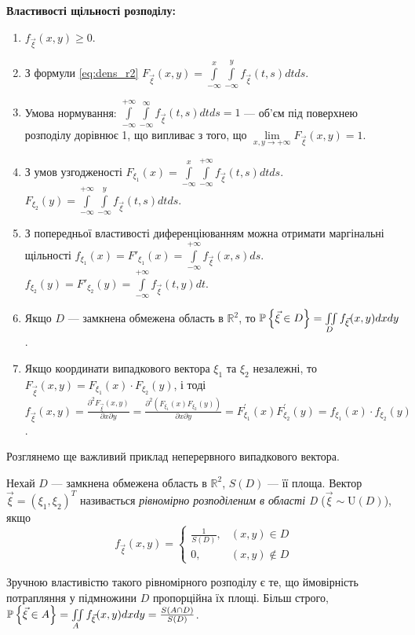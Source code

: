 \noindent\textbf{Властивості щільності розподілу:}
\begin{enumerate}
    \item $f_{\vec{\xi}}(x, y) \geq 0$.
    \item З формули \eqref{eq:dens_r2} $F_{\vec{\xi}}(x, y) 
    = \int\limits_{-\infty}^x \int\limits_{-\infty}^y f_{\vec{\xi}}(t, s) 
    dt ds $.
    \item Умова нормування: 
    $\int\limits_{-\infty}^{+\infty} \int\limits_{-\infty}^{\infty} f_{\vec{\xi}}(t, s) 
    dt ds = 1$ --- об'єм під поверхнею розподілу 
    дорівнює 1, що випливає з того, що $\lim\limits_{x,y \to +\infty} F_{\vec{\xi}}(x, y) = 1$.
    \item З умов узгодженості $F_{\xi_1}(x) = \int\limits_{-\infty}^{x} \int\limits_{-\infty}^{+\infty} 
    f_{\vec{\xi}}(t, s) dt ds$.
    $F_{\xi_2}(y) = \int\limits_{-\infty}^{+\infty} \int\limits_{-\infty}^{y} 
    f_{\vec{\xi}}(t, s) dt ds$.
    \item З попередньої властивості диференціюванням можна отримати маргінальні щільності $f_{\xi_1}(x) = F'_{\xi_1}(x) 
    = \int\limits_{-\infty}^{+\infty} f_{\vec{\xi}}(x, s) ds $.
    $f_{\xi_2}(y) = F'_{\xi_2}(y) 
    = \int\limits_{-\infty}^{+\infty} f_{\vec{\xi}}(t, y) dt $.
    
    \item Якщо $D$ --- замкнена обмежена область в $\mathbb{R}^2$, то 
    $\P\left\{ \vec{\xi} \in D \right\} = \iint\limits_D f_{\vec{\xi}}(x, y) 
    dx dy$.
    \item Якщо координати випадкового вектора $\xi_1$ та $\xi_2$ незалежні, то
    $F_{\vec{\xi}}(x, y) = 
    F_{\xi_1}(x)\cdot F_{\xi_2}(y)$, і тоді
    $f_{\vec{\xi}}(x, y) = \frac{\partial^2 F_{\vec{\xi}}(x, y)}
    {\partial x \partial y} = \frac{\partial^2(F_{\xi_1}(x)F_{\xi_2}(y))}{\partial x \partial y} 
    = F_{\xi_1}^\prime (x)F_{\xi_2}^\prime (y) = 
    f_{\xi_1}(x)\cdot f_{\xi_2}(y)$.
\end{enumerate}
\vspace{1em}
Розглянемо ще важливий приклад неперервного випадкового вектора.
\begin{definition}
    Нехай $D$ --- замкнена обмежена область в $\mathbb{R}^2$,
    $S(D)$ --- її площа. 
    Вектор $\vec{\xi} = (\xi_1,\xi_2)^T$ називається 
    \emph{рівномірно розподіленим в області D} ($\vec{\xi} \sim \mathrm{U}(D)$), якщо 
    \begin{equation*}
        f_{\vec{\xi}}(x, y) = 
        \begin{cases}
            \frac{1}{S(D)},&(x, y) \in D \\
            0,&(x, y) \notin D
        \end{cases}
    \end{equation*}
\end{definition}
Зручною властивістю такого рівномірного розподілу є те, що
ймовірність потрапляння у підмножини $D$ пропорційна їх площі.
Більш строго, $\P\left\{\vec{\xi}\in A \right\} = \iint\limits_A f_{\vec{\xi}}(x, y) dx dy = 
\frac{S(A \cap D)}{S(D)}$.

